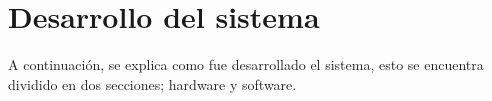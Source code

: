 
\chapter{Desarrollo del sistema}\label{chapter5}
A continuación, se explica como fue desarrollado el sistema, esto se encuentra dividido en dos secciones; hardware y software.




